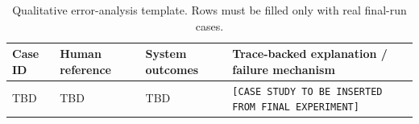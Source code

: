 \begin{table}[htbp]
\centering
\footnotesize
\caption{Qualitative error-analysis template. Rows must be filled only with real final-run cases.}
\label{tab:error-case-template}
\begin{tabularx}{\textwidth}{p{2.1cm}p{2.6cm}p{2.3cm}X}
\toprule
\textbf{Case ID} & \textbf{Human reference} & \textbf{System outcomes} & \textbf{Trace-backed explanation / failure mechanism} \\
\midrule
TBD & TBD & TBD & \texttt{[CASE STUDY TO BE INSERTED FROM FINAL EXPERIMENT]} \\
\bottomrule
\end{tabularx}
\end{table}
